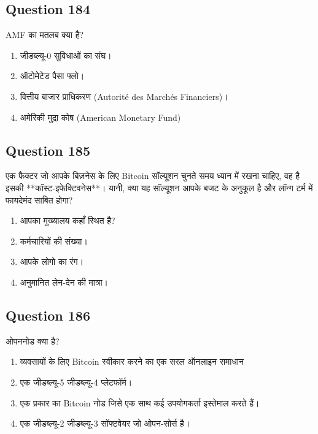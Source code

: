 \documentclass[12pt,a4paper]{article}
\begin{document}
\bigskip


\subsection*{Question 184}
AMF का मतलब क्या है?

\begin{enumerate}[label=\Alph*., leftmargin=*]
\item जीडब्ल्यू-0 सुविधाओं का संघ।
\item ऑटोमेटेड पैसा फ्लो।
\item वित्तीय बाजार प्राधिकरण (Autorité des Marchés Financiers)।
\item अमेरिकी मुद्रा कोष (American Monetary Fund)
\end{enumerate}

\bigskip


\subsection*{Question 185}
एक फैक्टर जो आपके बिज़नेस के लिए Bitcoin सॉल्यूशन चुनते समय ध्यान में रखना चाहिए, वह है इसकी **कॉस्ट-इफेक्टिवनेस**। यानी, क्या यह सॉल्यूशन आपके बजट के अनुकूल है और लॉन्ग टर्म में फायदेमंद साबित होगा?

\begin{enumerate}[label=\Alph*., leftmargin=*]
\item आपका मुख्यालय कहाँ स्थित है?
\item कर्मचारियों की संख्या।
\item आपके लोगो का रंग।
\item अनुमानित लेन-देन की मात्रा।
\end{enumerate}

\bigskip


\subsection*{Question 186}
ओपननोड क्या है?

\begin{enumerate}[label=\Alph*., leftmargin=*]
\item व्यवसायों के लिए Bitcoin स्वीकार करने का एक सरल ऑनलाइन समाधान
\item एक जीडब्ल्यू-5 जीडब्ल्यू-4 प्लेटफॉर्म।
\item एक प्रकार का Bitcoin नोड जिसे एक साथ कई उपयोगकर्ता इस्तेमाल करते हैं।
\item एक जीडब्ल्यू-2 जीडब्ल्यू-3 सॉफ्टवेयर जो ओपन-सोर्स है।
\end{enumerate}
\end{document}
